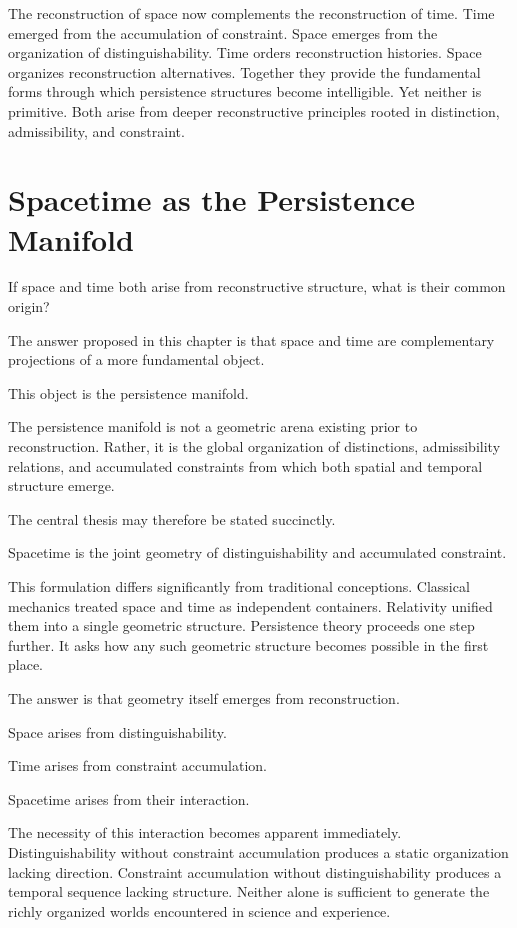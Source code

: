 \documentclass[12pt,oneside]{article}
\theoremstyle{definition}
\begin{document}
The reconstruction of space now complements the reconstruction of time. Time emerged from the accumulation of constraint. Space emerges from the organization of distinguishability. Time orders reconstruction histories. Space organizes reconstruction alternatives. Together they provide the fundamental forms through which persistence structures become intelligible. Yet neither is primitive. Both arise from deeper reconstructive principles rooted in distinction, admissibility, and constraint.

\section{Spacetime as the Persistence Manifold}

If space and time both arise from reconstructive structure, what is their common origin?

The answer proposed in this chapter is that space and time are complementary projections of a more fundamental object.

This object is the persistence manifold.

The persistence manifold is not a geometric arena existing prior to reconstruction. Rather, it is the global organization of distinctions, admissibility relations, and accumulated constraints from which both spatial and temporal structure emerge.

The central thesis may therefore be stated succinctly.

Spacetime is the joint geometry of distinguishability and accumulated constraint.

This formulation differs significantly from traditional conceptions. Classical mechanics treated space and time as independent containers. Relativity unified them into a single geometric structure. Persistence theory proceeds one step further. It asks how any such geometric structure becomes possible in the first place.

The answer is that geometry itself emerges from reconstruction.

Space arises from distinguishability.

Time arises from constraint accumulation.

Spacetime arises from their interaction.

The necessity of this interaction becomes apparent immediately. Distinguishability without constraint accumulation produces a static organization lacking direction. Constraint accumulation without distinguishability produces a temporal sequence lacking structure. Neither alone is sufficient to generate the richly organized worlds encountered in science and experience.
\end{document}
